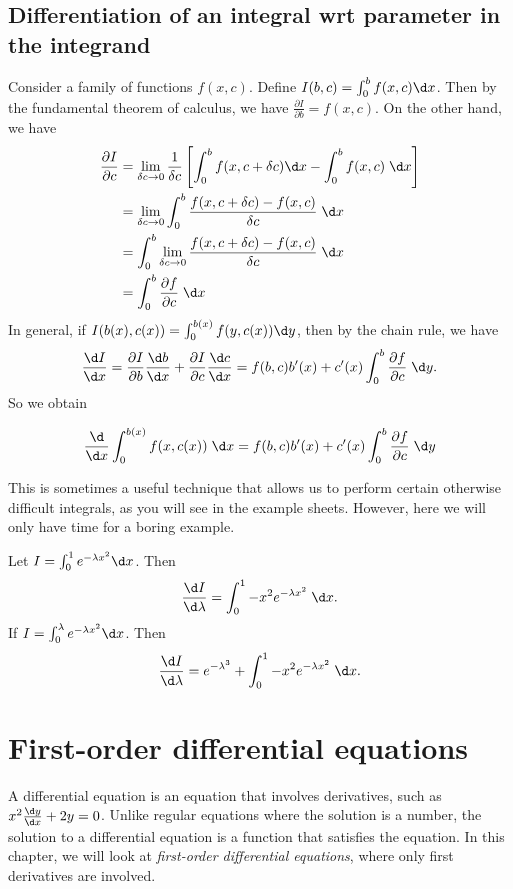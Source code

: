 \documentclass[a4paper]{article}
\begin{document}
\subsection{Differentiation of an integral wrt parameter in the integrand}
Consider a family of functions $f(x, c)$. Define $I(b, c) = \int_0^bf(x, c)\d x$. Then by the fundamental theorem of calculus, we have $\frac{\partial I}{\partial b} = f(x, c)$. On the other hand, we have
\begin{align*}
  \frac{\partial I}{\partial c} &= \lim_{\delta c\to 0}\frac{1}{\delta c}\left[\int_0^bf(x, c + \delta c)\d x - \int_0^b f(x, c)\;\d x\right]\\
  &= \lim_{\delta c\to 0}\int_0^b\frac{f(x, c + \delta c) - f(x, c)}{\delta c}\;\d x\\
  &= \int_0^b\lim_{\delta c\to 0}\frac{f(x, c + \delta c) - f(x, c)}{\delta c}\;\d x\\
  &= \int_0^b\frac{\partial f}{\partial c}\;\d x
\end{align*}
In general, if $I(b(x), c(x)) = \int_0^{b(x)} f(y, c(x))\d y$, then by the chain rule, we have
\[
  \frac{\d I}{\d x} = \frac{\partial I}{\partial b}\frac{\d b}{\d x} + \frac{\partial I}{\partial c}\frac{\d c}{\d x} = f(b, c)b'(x) + c'(x) \int_0^b\frac{\partial f}{\partial c}\;\d y.
\]
So we obtain

\begin{thm}
  \[
    \frac{\d}{\d x} \int_{0}^{b(x)} f(x, c(x))\;\d x= f(b, c)b'(x) + c'(x)\int_0^b \frac{\partial f}{\partial c}\;\d y
  \]
\end{thm}
This is sometimes a useful technique that allows us to perform certain otherwise difficult integrals, as you will see in the example sheets. However, here we will only have time for a boring example.

\begin{eg}
  Let $I = \int_0^1 e^{-\lambda x^2}\d x$. Then
  \[
    \frac{\d I}{\d \lambda} = \int_0^1-x^2e^{-\lambda x^2}\;\d x.
  \]
  If $I = \int_0^\lambda e^{-\lambda x^2}\d x$. Then
  \[
    \frac{\d I}{\d \lambda} = e^{-\lambda^3} + \int_0^1-x^2e^{-\lambda x^2}\;\d x.
  \]
\end{eg}

\section{First-order differential equations}
A differential equation is an equation that involves derivatives, such as $x^2\frac{\d y}{\d x} + 2y = 0$. Unlike regular equations where the solution is a number, the solution to a differential equation is a function that satisfies the equation. In this chapter, we will look at \emph{first-order differential equations}, where only first derivatives are involved.
\end{document}
